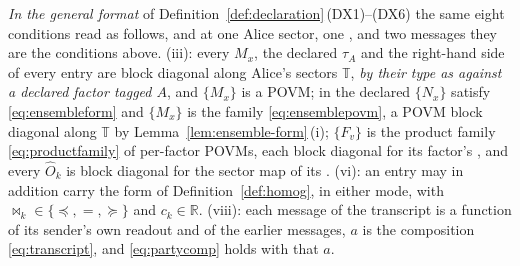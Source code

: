 \begin{definition}
\emph{In the general format} of Definition~\ref{def:declaration}\,(DX1)--(DX6)
the same eight conditions read as follows, and at one Alice sector, one
,  and two messages they are the
conditions above. (iii): every $M_x$, the declared $\tau_A$ and the
right-hand side of every  entry are block diagonal along
Alice's sectors $\mathbb{T}$, \emph{by their type as
 against a declared factor tagged $A$}, and
$\{M_x\}$ is a POVM; in  the declared $\{N_x\}$ satisfy
\eqref{eq:ensembleform} and $\{M_x\}$ is the family \eqref{eq:ensemblepovm},
a POVM block diagonal along $\mathbb{T}$ by
Lemma~\ref{lem:ensemble-form}\,(i); $\{F_v\}$ is the product family
\eqref{eq:productfamily} of per-factor POVMs, each block diagonal for its
factor's , and every $\hat O_k$ is block diagonal for the
sector map of its . (vi): an entry may in addition carry the
 form of Definition~\ref{def:homog}, in either mode, with
$\bowtie_k\in\{\preceq,=,\succeq\}$ and $c_k\in\mathbb{R}$. (viii): each
message of the transcript is a function of its sender's own readout and of
the earlier messages, $a$ is the composition \eqref{eq:transcript}, and
\eqref{eq:partycomp} holds with that $a$.
\end{definition}
